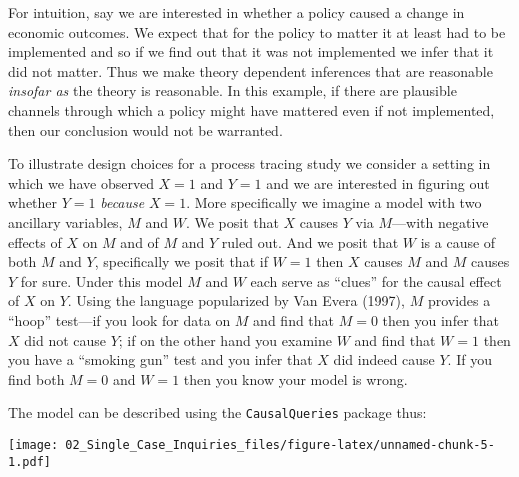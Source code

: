 \documentclass[
]{article}
\newenvironment{Shaded}{\begin{snugshade}}{\end{snugshade}}
\newcommand{\KeywordTok}[1]{\textcolor[rgb]{0.13,0.29,0.53}{\textbf{#1}}}
\newcommand{\NormalTok}[1]{#1}
\newcommand{\OperatorTok}[1]{\textcolor[rgb]{0.81,0.36,0.00}{\textbf{#1}}}
\newcommand{\StringTok}[1]{\textcolor[rgb]{0.31,0.60,0.02}{#1}}
\begin{document}
For intuition, say we are interested in whether a policy caused a change
in economic outcomes. We expect that for the policy to matter it at
least had to be implemented and so if we find out that it was not
implemented we infer that it did not matter. Thus we make theory
dependent inferences that are reasonable \emph{insofar as} the theory is
reasonable. In this example, if there are plausible channels through
which a policy might have mattered even if not implemented, then our
conclusion would not be warranted.

To illustrate design choices for a process tracing study we consider a
setting in which we have observed \(X=1\) and \(Y=1\) and we are
interested in figuring out whether \(Y=1\) \emph{because} \(X=1\). More
specifically we imagine a model with two ancillary variables, \(M\) and
\(W\). We posit that \(X\) causes \(Y\) via \(M\)---with negative
effects of \(X\) on \(M\) and of \(M\) and \(Y\) ruled out. And we posit
that \(W\) is a cause of both \(M\) and \(Y\), specifically we posit
that if \(W=1\) then \(X\) causes \(M\) and \(M\) causes \(Y\) for sure.
Under this model \(M\) and \(W\) each serve as ``clues'' for the causal
effect of \(X\) on \(Y\). Using the language popularized by Van Evera
(1997), \(M\) provides a ``hoop'' test---if you look for data on \(M\)
and find that \(M=0\) then you infer that \(X\) did not cause \(Y\); if
on the other hand you examine \(W\) and find that \(W=1\) then you have
a ``smoking gun'' test and you infer that \(X\) did indeed cause \(Y\).
If you find both \(M=0\) and \(W=1\) then you know your model is wrong.

The model can be described using the \texttt{CausalQueries} package
thus:

\begin{Shaded}
\end{Shaded}

\texttt{[image: 02\_Single\_Case\_Inquiries\_files/figure-latex/unnamed-chunk-5-1.pdf]}
\end{document}
